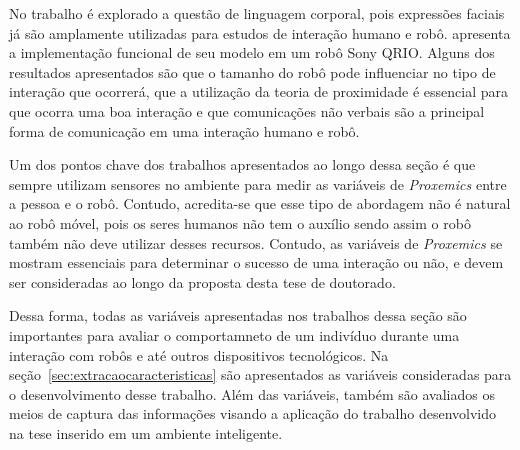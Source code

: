 No trabalho é explorado a questão de linguagem corporal, pois expressões faciais já são amplamente utilizadas para estudos de interação humano e robô.  apresenta a implementação funcional de seu modelo em um robô Sony QRIO. Alguns dos resultados apresentados são que o tamanho do robô pode influenciar no tipo de interação que ocorrerá, que a utilização da teoria de proximidade é essencial para que ocorra uma boa interação e que comunicações não verbais são a principal forma de comunicação em uma interação humano e robô.

Um dos pontos chave dos trabalhos apresentados ao longo dessa seção é que sempre utilizam sensores no ambiente para medir as variáveis de \emph{Proxemics} entre a pessoa e o robô. Contudo, acredita-se que esse tipo de abordagem não é natural ao robô móvel, pois os seres humanos não tem o auxílio sendo assim o robô também não deve utilizar desses recursos. Contudo, as variáveis de \emph{Proxemics} se mostram essenciais para determinar o sucesso de uma interação ou não, e devem ser consideradas ao longo da proposta desta tese de doutorado.

Dessa forma, todas as variáveis apresentadas nos trabalhos dessa seção são importantes para avaliar o comportamneto de um indivíduo durante uma interação com robôs e até outros dispositivos tecnológicos. Na seção~\ref{sec:extracaocaracteristicas} são apresentados as variáveis consideradas para o desenvolvimento desse trabalho. Além das variáveis, também são avaliados os meios de captura das informações visando a aplicação do trabalho desenvolvido na tese inserido em um ambiente inteligente.
